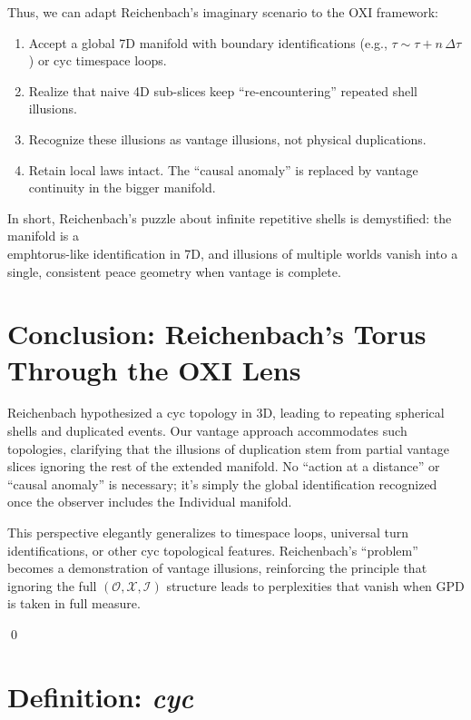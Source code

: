 \documentclass{article}
\begin{document}
Thus, we can adapt Reichenbach’s imaginary scenario to the OXI framework:
\begin{enumerate}
\item Accept a global 7D manifold with boundary identifications (e.g., $\tau \sim \tau + n\,\Delta\tau$) or cyc timespace loops.
\item Realize that naive 4D sub-slices keep “re-encountering” repeated shell illusions.
\item Recognize these illusions as vantage illusions, not physical duplications.
\item Retain local laws intact. The “causal anomaly” is replaced by vantage continuity in the bigger manifold.
\end{enumerate}

In short, Reichenbach’s puzzle about infinite repetitive shells is demystified: the manifold is a \\emph{torus-like identification} in 7D, and illusions of multiple worlds vanish into a single, consistent peace geometry when vantage is complete.

\section{Conclusion: Reichenbach’s Torus Through the OXI Lens}

Reichenbach hypothesized a cyc topology in 3D, leading to repeating spherical shells and duplicated events. Our vantage approach accommodates such topologies, clarifying that the illusions of duplication stem from partial vantage slices ignoring the rest of the extended manifold. No “action at a distance” or “causal anomaly” is necessary; it’s simply the global identification recognized once the observer includes the Individual manifold. 

This perspective elegantly generalizes to timespace loops, universal turn identifications, or other cyc topological features. Reichenbach’s “problem” becomes a demonstration of vantage illusions, reinforcing the principle that ignoring the full $(\mathcal{O},\mathcal{X},\mathcal{I})$ structure leads to perplexities that vanish when GPD is taken in full measure.

\qed





\section*{Definition: \textit{cyc}}
\end{document}
